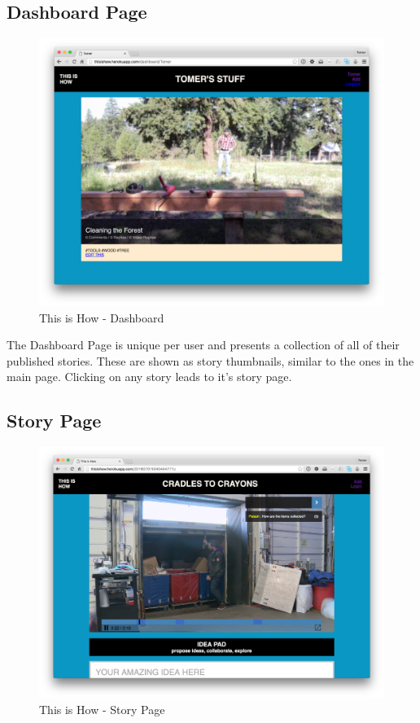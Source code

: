 \subsection{Dashboard Page}

   \begin{figure}[thpb]
      \centering
      \includegraphics[width=\textwidth]{figures/dashboard.png}
      \caption{This is How - Dashboard}
      \label{fig_dashboard_page}
   \end{figure}

The Dashboard Page is unique per user and presents a collection of all of their published stories. These are shown as story thumbnails, similar to the ones in the main page. Clicking on any story leads to it's story page. 

\subsection{Story Page}

   \begin{figure}[thpb]
      \centering
      \includegraphics[width=\textwidth]{figures/storypage.png}
      \caption{This is How - Story Page}
      \label{fig_dashboard_page}
   \end{figure}

